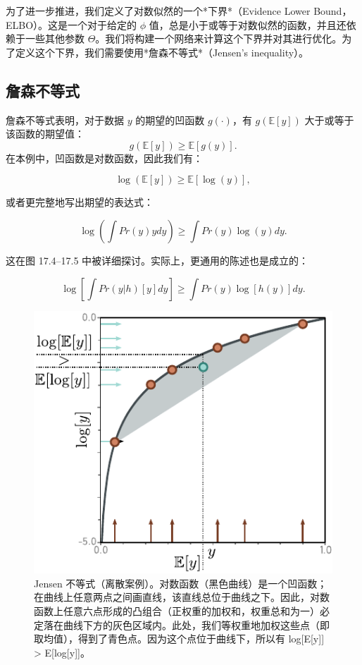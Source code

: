 \documentclass[lang=cn,newtx,10pt,scheme=chinese]{elegantbook}
\begin{document}
为了进一步推进，我们定义了对数似然的一个*下界*（Evidence Lower Bound，ELBO）。这是一个对于给定的 \(\phi\) 值，总是小于或等于对数似然的函数，并且还依赖于一些其他参数 \(\Theta\)。我们将构建一个网络来计算这个下界并对其进行优化。为了定义这个下界，我们需要使用*詹森不等式*（Jensen's inequality）。

\subsection{詹森不等式}

詹森不等式表明，对于数据 \(y\) 的期望的凹函数 \(g(\cdot)\)，有 \(g(\mathbb{E}[y])\) 大于或等于该函数的期望值：
\begin{equation}
g(\mathbb{E}[y]) \geq \mathbb{E}[g(y)]. 
\end{equation}
在本例中，凹函数是对数函数，因此我们有：

\begin{equation}
\log(\mathbb{E}[y]) \geq \mathbb{E}[\log(y)], 
\end{equation}

或者更完整地写出期望的表达式：

\begin{equation}
\log \left( \int Pr(y)ydy \right) \geq \int Pr(y)\log(y)dy. 
\end{equation}

这在图 17.4–17.5 中被详细探讨。实际上，更通用的陈述也是成立的：

\begin{equation}
\log \left[ \int Pr(y|h)[y] dy \right] \geq \int Pr(y) \log[h(y)]dy. 
\end{equation}


\begin{figure}[ht!]
\centering
\includegraphics[width=0.7\linewidth]{PDFFigures/UDLChap17PDF/VAEJensenUnder.pdf}
\caption{Jensen 不等式（离散案例）。对数函数（黑色曲线）是一个凹函数；在曲线上任意两点之间画直线，该直线总位于曲线之下。因此，对数函数上任意六点形成的凸组合（正权重的加权和，权重总和为一）必定落在曲线下方的灰色区域内。此处，我们等权重地加权这些点（即取均值），得到了青色点。因为这个点位于曲线下，所以有 log[E[y]] > E[log[y]]。}
\end{figure}
\end{document}
